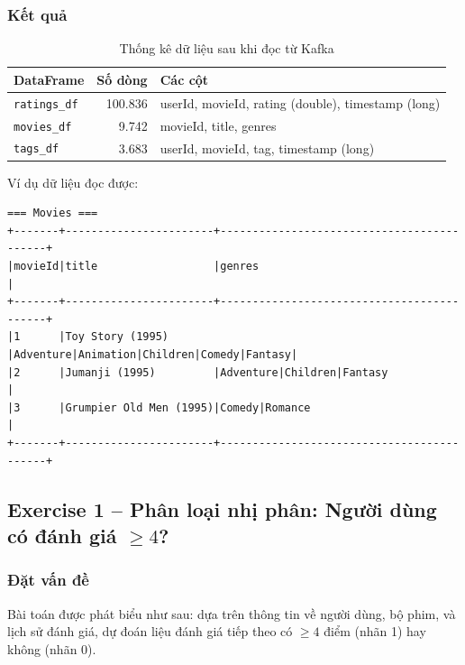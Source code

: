 \subsubsection{Kết quả}

\begin{table}[h]
\centering
\begin{tabular}{|l|r|l|}
\hline
\textbf{DataFrame} & \textbf{Số dòng} & \textbf{Các cột} \\
\hline
\texttt{ratings\_df} & 100.836 & userId, movieId, rating (double), timestamp (long) \\
\hline
\texttt{movies\_df}  & 9.742   & movieId, title, genres \\
\hline
\texttt{tags\_df}    & 3.683   & userId, movieId, tag, timestamp (long) \\
\hline
\end{tabular}
\caption{Thống kê dữ liệu sau khi đọc từ Kafka}
\end{table}

Ví dụ dữ liệu đọc được:

\begin{verbatim}
=== Movies ===
+-------+-----------------------+-------------------------------------------+
|movieId|title                  |genres                                     |
+-------+-----------------------+-------------------------------------------+
|1      |Toy Story (1995)       |Adventure|Animation|Children|Comedy|Fantasy|
|2      |Jumanji (1995)         |Adventure|Children|Fantasy                 |
|3      |Grumpier Old Men (1995)|Comedy|Romance                             |
+-------+-----------------------+-------------------------------------------+
\end{verbatim}

\subsection{Exercise 1 -- Phân loại nhị phân: Người dùng có đánh giá $\geq 4$?}

\subsubsection{Đặt vấn đề}

Bài toán được phát biểu như sau: dựa trên thông tin về người dùng, bộ phim, và lịch sử đánh giá, dự đoán liệu đánh giá tiếp theo có $\geq 4$ điểm (nhãn 1) hay không (nhãn 0).

